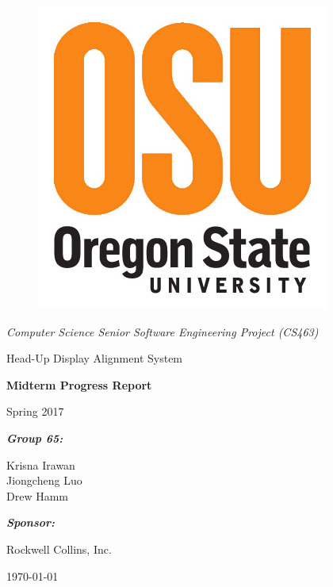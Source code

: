 \documentclass[letterpaper,10pt,onecolumn]{IEEEtran}
\def\title{Computer Science Senior Software Engineering Project (CS463)}
\def\name{Krisna Irawan\\ Jiongcheng Luo\\ Drew Hamm}
\def\doc{Midterm Progress Report}
\def\term{Spring 2017}
\def\project{Head-Up Display Alignment System}
\begin{document}
\begin{titlepage}
\centering
	\begin{figure}
	      	\includegraphics[scale=0.25]{osu_logo}
	\end{figure}
	{\Large\itshape \title\par}
	\vspace{1.5cm}
	\scshape{
		{\Huge \project\par}

		\vspace{1.5cm}
		{\Huge\bfseries\doc\par}
		{\huge \term\par}
	}
	\vspace{2cm}
	{\large\itshape\bfseries Group 65:\par}
	{\large \name\par}
	\vspace{2cm}
	{\large\itshape\bfseries Sponsor:\par}
	{\large Rockwell Collins, Inc.\par}
	\vspace{2cm}
	{\large \today\par}
	\vspace{2cm}

	\begin{abstract}
		This document reports the progress that we have made since the beginning of spring term of 2017. This report mainly introduces our current progress and remaining works of the project, problems that we encoutered and their solutions. This report will also cover the highlighted codes of the software as well as a prelimary result of this project.
	\end{abstract}
	\vfill

\end{titlepage}
\tableofcontents


\newpage


\end{document}
